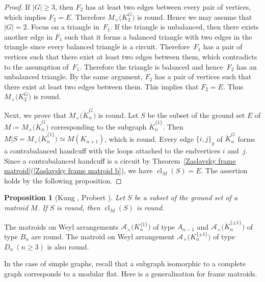 \documentclass[pdftex]{sigma}
\numberwithin{equation}{section}
\newtheorem{Proposition}[Theorem]{Proposition}
 { \theoremstyle{definition}
\newtheorem{Definition}[Theorem]{Definition}
\newtheorem{Example}[Theorem]{Example}
\newtheorem{Remark}[Theorem]{Remark}
\newtheorem{Question}[Theorem]{Question} }
\DeclareMathOperator{\cl}{cl}
\begin{document}
\begin{proof}
If $ |G| \geq 3 $, then $ F_{2} $ has at least two edges between every pair of vertices, which implies $ F_{2} = E $.
Therefore $ M_{\times}\big(K_{2}^{G}\big) $ is round.
Hence we may assume that $ |G|=2 $.
Focus on a triangle in~$ F_{1} $.
If the triangle is unbalanced, then there exists another edge in $ F_{1} $ such that it forms a balanced triangle with two edges in the triangle since every balanced triangle is a circuit.
Therefore~$ F_{1} $ has a pair of vertices such that there exist at least two edges between them, which contradicts to the assumption of~$ F_{1} $.
Therefore the triangle is balanced and hence~$ F_{2} $ has an unbalanced triangle.
By the same argument, $ F_{2} $ has a pair of vertices such that there exist at least two edges between them.
This implies that $ F_{2}=E $.
Thus $ M_{\times}\big(K_{2}^{G}\big) $ is round.

Next, we prove that $ M_{\times}\big(\mathring{K}_{n}^{G}\big) $ is round.
Let $ S $ be the subset of the ground set $ E $ of $ M \coloneqq M_{\times}\big(\mathring{K}_{n}^{G}\big) $ corresponding to the subgraph $ \mathring{K}_{n}^{\{1\}} $.
Then $ M|S = M_{\times}\big(\mathring{K}_{n}^{\{1\}}\big) \simeq M(K_{n+1}) $, which is round.
Every edge $ \{i,j\}_{g} $ of $ \mathring{K}_{n}^{G} $ forms a contrabalanced handcuff with the loops attached to the endvertices $ i $ and~$ j $.
Since a contrabalanced handcuff is a circuit by Theorem~\ref{Zaslavsky frame matroid}(\ref{Zaslavsky frame matroid b}), we have $ \cl_{M}(S) = E $. The assertion holds by the following proposition.
\end{proof}

\begin{Proposition}[{Kung \cite[Lemma 4.1]{kung1986numerically-gd}}, {Probert \cite[Lemma 4.2.7]{probert2018chordality}}]
Let $ S $ be a subset of the ground set of a matroid $ M $.
If $ S $ is round, then $ \cl_{M}(S) $ is round.
\end{Proposition}

\begin{Example}
The matroids on Weyl arrangements $ \mathcal{A}_{\times}\big(K_{n}^{\{1\}}\big) $ of type $ A_{n-1} $ and $ \mathcal{A}_{\times}\big(\mathring{K}_{n}^{\{\pm 1\}}\big) $ of type $ B_{n} $ are round.
The matroid on Weyl arrangement $ \mathcal{A}_{\times}\big(K_{n}^{\{\pm 1\}}\big) $ of type $ D_{n} \ (n \geq 3) $ is also round.
\end{Example}

In the case of simple graphs, recall that a subgraph isomorphic to a complete graph corresponds to a modular flat.
Here is a generalization for frame matroids.
\end{document}
